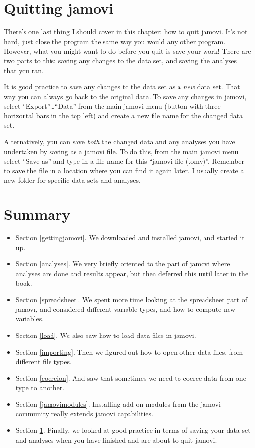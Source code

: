 \documentclass[
]{book}
\providecommand{\tightlist}{%
  \setlength{\itemsep}{0pt}\setlength{\parskip}{0pt}}
\begin{document}
\hypertarget{quittingjamovi}{%
\section{Quitting jamovi}\label{quittingjamovi}}

There's one last thing I should cover in this chapter: how to quit jamovi. It's not hard, just close the program the same way you would any other program. However, what you might want to do before you quit is save your work! There are two parts to this: saving any changes to the data set, and saving the analyses that you ran.

It is good practice to save any changes to the data set as a \emph{new} data set. That way you can always go back to the original data. To save any changes in jamovi, select ``Export''\ldots{}``Data'' from the main jamovi menu (button with three horizontal bars in the top left) and create a new file name for the changed data set.

Alternatively, you can save \emph{both} the changed data and any analyses you have undertaken by saving as a jamovi file. To do this, from the main jamovi menu select ``Save as'' and type in a file name for this ``jamovi file (.omv)''. Remember to save the file in a location where you can find it again later. I usually create a new folder for specific data sets and analyses.

\hypertarget{summary-1}{%
\section{Summary}\label{summary-1}}

\begin{itemize}
\tightlist
\item
  Section \ref{gettingjamovi}. We downloaded and installed jamovi, and started it up.
\item
  Section \ref{analyses}. We very briefly oriented to the part of jamovi where analyses are done and results appear, but then deferred this until later in the book.
\item
  Section \ref{spreadsheet}. We spent more time looking at the spreadsheet part of jamovi, and considered different variable types, and how to compute new variables.
\item
  Section \ref{load}. We also saw how to load data files in jamovi.
\item
  Section \ref{importing}. Then we figured out how to open other data files, from different file types.
\item
  Section \ref{coercion}. And saw that sometimes we need to coerce data from one type to another.
\item
  Section \ref{jamovimodules}. Installing add-on modules from the jamovi community really extends jamovi capabilities.
\item
  Section \ref{quittingjamovi}. Finally, we looked at good practice in terms of saving your data set and analyses when you have finished and are about to quit jamovi.
\end{itemize}
\end{document}
